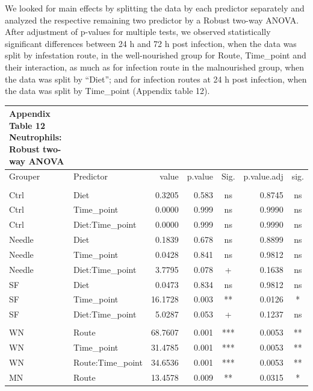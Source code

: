 \documentclass[
  12pt,
  letterpaper,
]{article}
\begin{document}
We looked for main effects by splitting the data by each predictor separately and analyzed the respective remaining two predictor by a Robust two-way ANOVA. After adjustment of p-values for multiple tests, we observed statistically significant differences between 24 h and 72 h post infection, when the data was split by infestation route, in the well-nourished group for Route, Time\_point and their interaction, as much as for infection route in the malnourished group, when the data was split by ``Diet''; and for infection routes at 24 h post infection, when the data was split by Time\_point (Appendix table 12).

\begingroup
\fontsize{12.0pt}{14.4pt}\selectfont
\begin{longtable}{l|lrrcrc}
\caption*{
{\large \textbf{Appendix Table 12}} \\ 
{\small \textbf{Neutrophils: Robust two-way ANOVA}}
} \\ 
\toprule
Grouper & {Predictor} & {value} & {p.value} & {Sig.} & {p.value.adj} & {sig.} \\ 
\midrule\addlinespace[2.5pt]
\multicolumn{7}{l}{Grouped by Route} \\[2.5pt] 
\midrule\addlinespace[2.5pt]
Ctrl & Diet & 0.3205 & 0.583 & ns & 0.8745 & ns \\ 
Ctrl & Time\_point & 0.0000 & 0.999 & ns & 0.9990 & ns \\ 
Ctrl & Diet:Time\_point & 0.0000 & 0.999 & ns & 0.9990 & ns \\ 
Needle & Diet & 0.1839 & 0.678 & ns & 0.8899 & ns \\ 
Needle & Time\_point & 0.0428 & 0.841 & ns & 0.9812 & ns \\ 
Needle & Diet:Time\_point & 3.7795 & 0.078 & + & 0.1638 & ns \\ 
SF & Diet & 0.0473 & 0.834 & ns & 0.9812 & ns \\ 
SF & Time\_point & 16.1728 & 0.003 & ** & 0.0126 & * \\ 
SF & Diet:Time\_point & 5.0287 & 0.053 & + & 0.1237 & ns \\ 
\midrule\addlinespace[2.5pt]
\multicolumn{7}{l}{Grouped by Diet} \\[2.5pt] 
\midrule\addlinespace[2.5pt]
WN & Route & 68.7607 & 0.001 & *** & 0.0053 & ** \\ 
WN & Time\_point & 31.4785 & 0.001 & *** & 0.0053 & ** \\ 
WN & Route:Time\_point & 34.6536 & 0.001 & *** & 0.0053 & ** \\ 
MN & Route & 13.4578 & 0.009 & ** & 0.0315 & * \\ 

\end{longtable}
\end{document}
